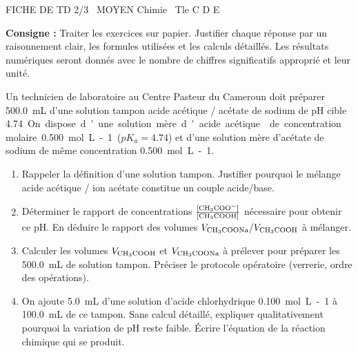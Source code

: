 \documentclass[11pt]{article}
\begin{document}
\begin{tcolorbox}[enhanced,colback=popink,colframe=popink,arc=10pt,boxrule=0pt,left=12pt,right=12pt,top=9pt,bottom=9pt]
{\color{white}\popxbold\small FICHE DE TD 2/3 \textbullet\ MOYEN \hfill Chimie \textbullet\ Tle C D E\par}
\end{tcolorbox}
\vspace{4pt}
\noindent \textbf{Consigne :} Traiter les exercices sur papier. Justifier chaque réponse par un raisonnement clair, les formules utilisées et les calculs détaillés. Les résultats numériques seront donnés avec le nombre de chiffres significatifs approprié et leur unité.

\begin{exercice}
Un technicien de laboratoire au Centre Pasteur du Cameroun doit préparer \SI{500,0}{mL} d'une solution tampon acide acétique / acétate de sodium de pH cible \SI{4,74}. On dispose d'une solution mère d'acide acétique  de concentration molaire \SI{0,500}{mol.L-1} ($pK_a = \num{4,74}$) et d'une solution mère d'acétate de sodium  de même concentration \SI{0,500}{mol.L-1}.
\begin{enumerate}
    \item Rappeler la définition d'une solution tampon. Justifier pourquoi le mélange acide acétique / ion acétate constitue un couple acide/base.
    \item Déterminer le rapport de concentrations $\frac{[\ce{CH3COO-}]}{[\ce{CH3COOH}]}$ nécessaire pour obtenir ce pH. En déduire le rapport des volumes $V_{\ce{CH3COONa}} / V_{\ce{CH3COOH}}$ à mélanger.
    \item Calculer les volumes $V_{\ce{CH3COOH}}$ et $V_{\ce{CH3COONa}}$ à prélever pour préparer les \SI{500,0}{mL} de solution tampon. Préciser le protocole opératoire (verrerie, ordre des opérations).
    \item On ajoute \SI{5,0}{mL} d'une solution d'acide chlorhydrique \SI{0,100}{mol.L-1} à \SI{100,0}{mL} de ce tampon. Sans calcul détaillé, expliquer qualitativement pourquoi la variation de pH reste faible. Écrire l'équation de la réaction chimique qui se produit.
\end{enumerate}
\end{exercice}
\end{document}
